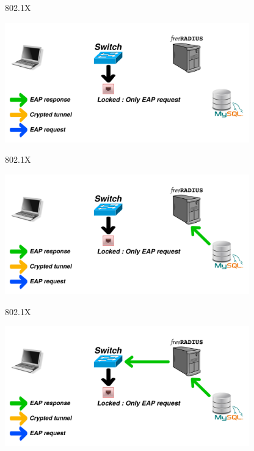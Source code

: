 \documentclass[12pt]{beamer}
\begin{document}
\begin{frame}[noframenumbering]{802.1X}
\vfill
\begin{center}
    \includegraphics[width=300pt]{img/dot1x_1.pdf}
\end{center}
\vfill
\end{frame}

\begin{frame}[noframenumbering]{802.1X}
\vfill
\begin{center}
    \includegraphics[width=300pt]{img/dot1x_5.pdf}
\end{center}
\vfill
\end{frame}

\begin{frame}[noframenumbering]{802.1X}
\vfill
\begin{center}
    \includegraphics[width=300pt]{img/dot1x_6.pdf}
\end{center}
\vfill
\end{frame}
\end{document}

